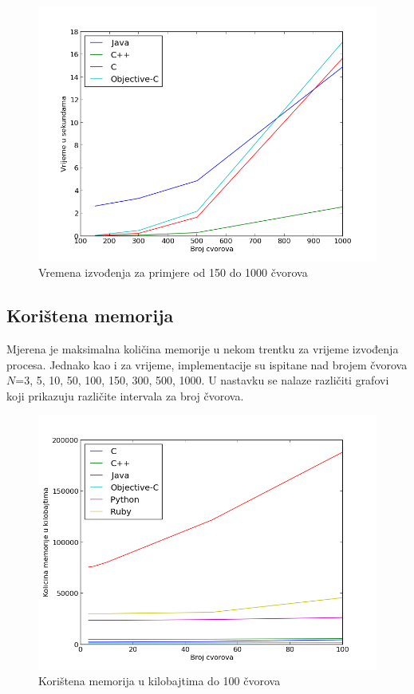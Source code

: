 \documentclass[times, utf8, seminar, numeric]{fer}
\begin{document}
\begin{figure}[!h]
\centering
\includegraphics[scale=0.6]{./img/Primjeri_150_1000.png}
\caption{Vremena izvođenja za primjere od 150 do 1000 čvorova}
\label{fig:time_150_1000}
\end{figure}

\newpage

\subsection{Korištena memorija}

Mjerena je maksimalna količina memorije u nekom trentku za vrijeme izvođenja procesa. Jednako kao i za vrijeme, implementacije su ispitane nad brojem čvorova $N$=3, 5, 10, 50, 100, 150, 300, 500, 1000. U nastavku se nalaze različiti grafovi koji prikazuju različite intervala za broj čvorova.  

\begin{figure}[!h]
\centering
\includegraphics[scale=0.6]{./img/memorija_100.png}
\caption{Korištena memorija u kilobajtima do 100 čvorova}
\label{fig:memorija_100}
\end{figure}
\end{document}
